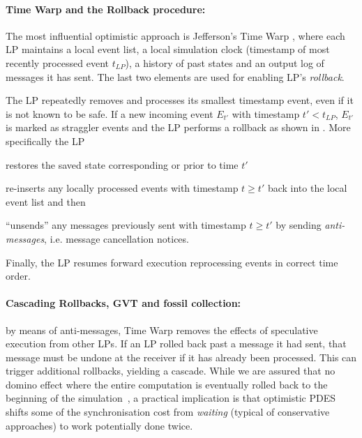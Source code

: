 \paragraph{Time Warp and the Rollback procedure:}
The most influential optimistic approach is Jefferson's Time
Warp \cite{jefferson1987TWOS}, where each \ac{LP} maintains a local event list,
a local simulation clock (timestamp of most recently processed event $t_{LP}$), a
history of past states and an output log of messages it has sent. The last two
elements are used for enabling \ac{LP}'s \emph{rollback}.

The \ac{LP} repeatedly removes and processes its smallest timestamp event, even if it
is not known to be safe. If a new incoming event $E_{t'}$ with timestamp $t' < t_{LP}$,
$E_{t'}$ is marked as straggler events and the \ac{LP} performs a rollback as shown in
.
%
%
More specifically the \ac{LP}
%
\begin{enumerate*}[label=(\roman*)]
	\item restores the saved state corresponding or prior to time $t'$
	\item re-inserts any locally processed events with timestamp $t \geq t'$
	      back into the local event list and then
	\item ``unsends'' any messages previously sent with timestamp $t \geq t'$
	      by sending \emph{anti-messages}, i.e. message cancellation notices.
\end{enumerate*}
%
Finally, the LP resumes forward execution reprocessing events in correct time
order.

\paragraph{Cascading Rollbacks, GVT and fossil collection:} by means of
anti-messages, Time Warp removes the effects of speculative execution from
other \ac{LP}s. If an \ac{LP} rolled back past a message it had sent, that
message must be undone at the receiver if it has already been processed. This
can trigger additional rollbacks, yielding a cascade. While we are assured that
no domino effect where the entire computation is eventually rolled back to the
beginning of the simulation~\cite{fujimoto1999Pads}, a practical implication is
that optimistic \ac{PDES} shifts some of the synchronisation cost from
\emph{waiting} (typical of conservative approaches) to work potentially done
twice.

